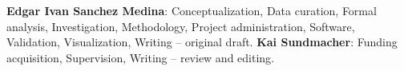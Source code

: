 \textbf{Edgar Ivan Sanchez Medina}: Conceptualization, Data curation, Formal analysis, Investigation, Methodology, Project administration, Software, Validation, Visualization, Writing – original draft.
\textbf{Kai Sundmacher}: Funding acquisition, Supervision, Writing – review and editing.





